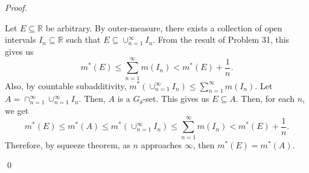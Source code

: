 \documentclass[12pt]{article}
\newenvironment{sol}
    {\emph{Proof.}
    }
    {
    \qed
    }
\begin{document}
\begin{sol}
Let $E \subseteq \mathbb{R}$ be arbitrary. By outer-measure, there exists a collection of open intervals $I_n \subseteq \mathbb{R}$ such that $E \subseteq \cup_{n = 1}^\infty I_n$. From the result of Problem 31, this gives us $$m^*(E) \leq \sum_{n = 1}^\infty m(I_n) < m^*(E) + \frac{1}{n}.$$ Also, by countable subadditivity, $m^*(\cup_{n = 1}^\infty I_n) \leq \sum_{n = 1}^\infty m(I_n)$. Let $A = \cap_{n = 1}^\infty \cup_{n = 1}^\infty I_n$. Then, $A$ is a $G_\delta$-set. This gives us $E \subseteq A$. Then, for each $n$, we get $$m^*(E) \leq m^*(A) \leq m^*(\cup_{n = 1}^\infty I_n) \leq \sum_{n = 1}^\infty m(I_n) < m^*(E) + \frac{1}{n}.$$ Therefore, by squeeze theorem, as $n$ approaches $\infty$, then $m^*(E) = m^*(A)$.
\end{sol}

\end{document}

